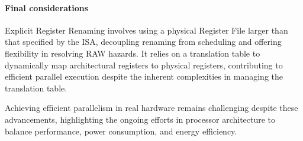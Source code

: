 \paragraph*{Final considerations}
Explicit Register Renaming involves using a physical Register File larger than that specified by the ISA, decoupling renaming from scheduling and offering flexibility in resolving RAW hazards. 
It relies on a translation table to dynamically map architectural registers to physical registers, contributing to efficient parallel execution despite the inherent complexities in managing the translation table.

Achieving efficient parallelism in real hardware remains challenging despite these advancements, highlighting the ongoing efforts in processor architecture to balance performance, power consumption, and energy efficiency.